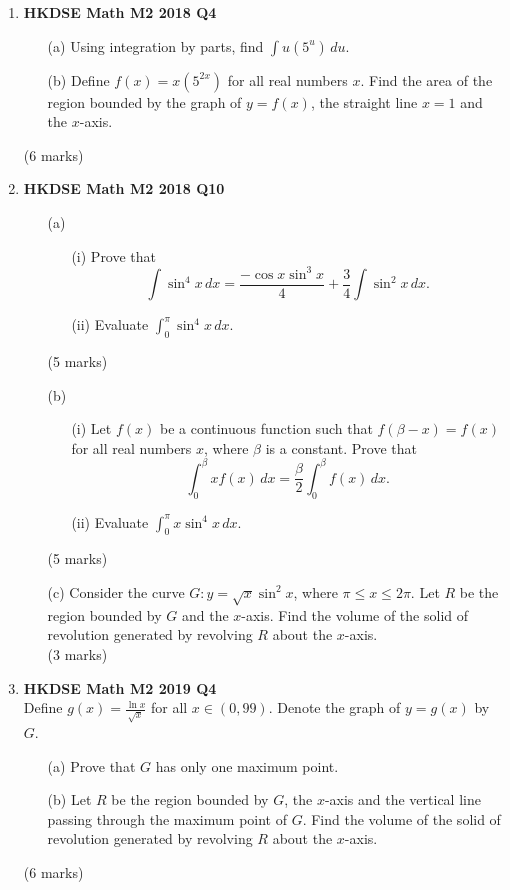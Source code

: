 \documentclass{report}
\begin{document}
\begin{enumerate}
	\item \textbf{HKDSE Math M2 2018 Q4}
	\begin{enumerate}
		\item [(a)]Using integration by parts, find $\displaystyle\int u(5^u) \,du$. 
		\item [(b)]Define $f(x) = x(5^{2x})$ for all real numbers $x$. Find the area of the region bounded by the graph of $y = f(x)$, the straight line $x = 1$ and the $x$-axis.
	\end{enumerate}
	(6 marks)

	\item \textbf{HKDSE Math M2 2018 Q10}
	\begin{enumerate}
		\item [(a)] 
		\begin{enumerate}
			\item [(i)]Prove that $$\displaystyle \int \sin^4{x}\,dx = \frac{-\cos{x}\sin^3{x}}{4} + \frac{3}{4} \int \sin^2{x} \,dx.$$ 
			\item [(ii)] Evaluate $\displaystyle \int_{0}^{\pi} \sin^4{x}\,dx$.
		\end{enumerate}
		(5 marks)
		\item [(b)] 
		\begin{enumerate}
			\item [(i)]Let $f(x)$ be a continuous function such that $f(\beta - x)= f(x)$ for all real numbers $x$, where $\beta$ is a constant. Prove that $$\displaystyle\int_{0}^{\beta} x f(x) \,dx = \frac{\beta}{2} \int_{0}^{\beta } f(x) \,dx.$$
			\item [(ii)] Evaluate $\displaystyle \int_{0}^{\pi} x\sin^4{x}\,dx$.
		\end{enumerate}
		(5 marks)
	\item [(c)]Consider the curve $G : y = \displaystyle \sqrt{x}\sin^2{x}$, where $\pi \leq x \leq 2\pi $.
	Let $R$ be the region bounded by $G$ and the $x$-axis.
	Find the volume of the solid of revolution generated by revolving $R$ about the $x$-axis. \\(3 marks) 
	\end{enumerate}

	\item \textbf{HKDSE Math M2 2019 Q4}\\
	Define $\displaystyle g(x) = \frac{\ln{x}}{\sqrt{x}}$ for all $x \in (0,99)$. Denote the graph of $y = g(x) $ by $G$. 
	\begin{enumerate}
		\item [(a)]Prove that $G$ has only one maximum point. 
		\item [(b)]Let $R$ be the region bounded by $G$, the $x$-axis and the vertical line passing through the maximum point of $G$. Find the volume of the solid of revolution generated by revolving $R$ about the $x$-axis.
	\end{enumerate}
	(6 marks)


\end{enumerate}
\end{document}
